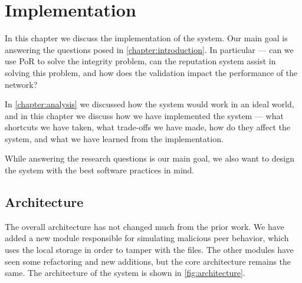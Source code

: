 \chapter{Implementation}
\label{chapter:implementation}

In this chapter we discuss the implementation of the system.
Our main goal is answering the questions posed in \autoref{chapter:introduction}.
In particular --- can we use PoR to solve the integrity problem,
can the reputation system assist in solving this problem,
and how does the validation impact the performance of the network?

In \autoref{chapter:analysis} we discussed how the system would work in an ideal world,
and in this chapter we discuss how we have implemented the system ---
what shortcuts we have taken, what trade-offs we have made,
how do they affect the system, and what we have learned from the implementation.

While answering the research questions is our main goal,
we also want to design the system with the best software practices in mind.

\section{Architecture}

The overall architecture has not changed much from the prior work.
We have added a new module responsible for simulating malicious peer behavior,
which uses the local storage in order to tamper with the files.
The other modules have seen some refactoring and new additions,
but the core architecture remains the same.
The architecture of the system is shown in \autoref{fig:architecture}.

